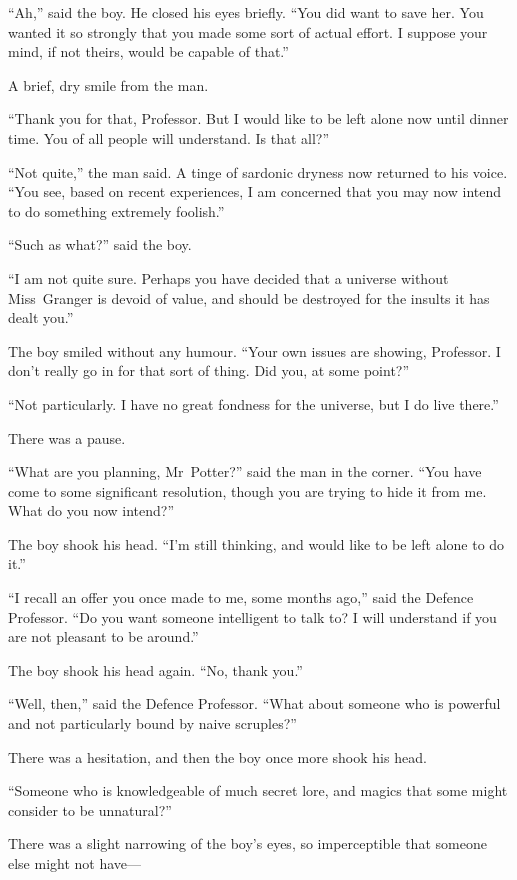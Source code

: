 “Ah,” said the boy. He closed his eyes briefly.
“You did want to save her. You wanted it so strongly that you made some sort of actual effort. I suppose your mind, if not theirs, would be capable of that.”

A brief, dry smile from the man.

“Thank you for that, Professor. But I would like to be left alone now until dinner time. You of all people will understand. Is that all?”

“Not quite,” the man said. A tinge of sardonic dryness now returned to his voice.
“You see, based on recent experiences, I am concerned that you may now intend to do something extremely foolish.”

“Such as what?” said the boy.

“I am not quite sure. Perhaps you have decided that a universe without Miss~Granger is devoid of value, and should be destroyed for the insults it has dealt you.”

The boy smiled without any humour.
“Your own issues are showing, Professor. I don’t really go in for that sort of thing. Did you, at some point?”

“Not particularly. I have no great fondness for the universe, but I do live there.”

There was a pause.

“What are you planning, Mr~Potter?” said the man in the corner.
“You have come to some significant resolution, though you are trying to hide it from me. What do you now intend?”

The boy shook his head.
“I’m still thinking, and would like to be left alone to do it.”

“I recall an offer you once made to me, some months ago,” said the Defence Professor.
“Do you want someone intelligent to talk to? I will understand if you are not pleasant to be around.”

The boy shook his head again.
“No, thank you.”

“Well, then,” said the Defence Professor.
“What about someone who is powerful and not particularly bound by naive scruples?”

There was a hesitation, and then the boy once more shook his head.

“Someone who is knowledgeable of much secret lore, and magics that some might consider to be unnatural?”

There was a slight narrowing of the boy’s eyes, so imperceptible that someone else might not have—

